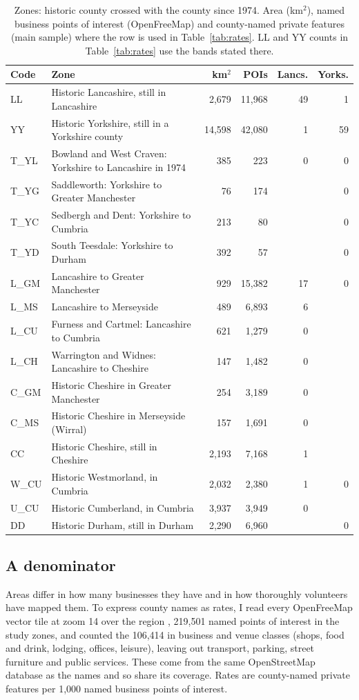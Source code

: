 \documentclass[11pt,a4paper]{article}
\begin{document}
\begin{table}[tbp]\centering\scriptsize\caption{Zones: historic county crossed with the county since 1974. Area (km$^2$), named business points of interest (OpenFreeMap) and county-named private features (main sample) where the row is used in Table~\ref{tab:rates}. LL and YY counts in Table~\ref{tab:rates} use the bands stated there.}\label{tab:zones}\begin{tabular}{lp{7.2cm}rrrr}\toprule Code & Zone & km$^2$ & POIs & Lancs. & Yorks.\\\midrule
LL & Historic Lancashire, still in Lancashire & 2,679 & 11,968 & 49 & 1\\
YY & Historic Yorkshire, still in a Yorkshire county & 14,598 & 42,080 & 1 & 59\\
T\_YL & Bowland and West Craven: Yorkshire to Lancashire in 1974 & 385 & 223 & 0 & 0\\
T\_YG & Saddleworth: Yorkshire to Greater Manchester & 76 & 174 &  & 0\\
T\_YC & Sedbergh and Dent: Yorkshire to Cumbria & 213 & 80 &  & 0\\
T\_YD & South Teesdale: Yorkshire to Durham & 392 & 57 &  & 0\\
L\_GM & Lancashire to Greater Manchester & 929 & 15,382 & 17 & 0\\
L\_MS & Lancashire to Merseyside & 489 & 6,893 & 6 & \\
L\_CU & Furness and Cartmel: Lancashire to Cumbria & 621 & 1,279 & 0 & \\
L\_CH & Warrington and Widnes: Lancashire to Cheshire & 147 & 1,482 & 0 & \\
C\_GM & Historic Cheshire in Greater Manchester & 254 & 3,189 & 0 & \\
C\_MS & Historic Cheshire in Merseyside (Wirral) & 157 & 1,691 & 0 & \\
CC & Historic Cheshire, still in Cheshire & 2,193 & 7,168 & 1 & \\
W\_CU & Historic Westmorland, in Cumbria & 2,032 & 2,380 & 1 & 0\\
U\_CU & Historic Cumberland, in Cumbria & 3,937 & 3,949 & 0 & \\
DD & Historic Durham, still in Durham & 2,290 & 6,960 &  & 0\\
\bottomrule\end{tabular}\end{table}

\subsection{A denominator}
Areas differ in how many businesses they have and in how thoroughly volunteers have mapped them. To express county names as rates, I read every OpenFreeMap vector tile at zoom 14 over the region \citep{openfreemap2026}, 219,501 named points of interest in the study zones, and counted the 106,414 in business and venue classes (shops, food and drink, lodging, offices, leisure), leaving out transport, parking, street furniture and public services. These come from the same OpenStreetMap database as the names and so share its coverage. Rates are county-named private features per 1,000 named business points of interest.
\end{document}
